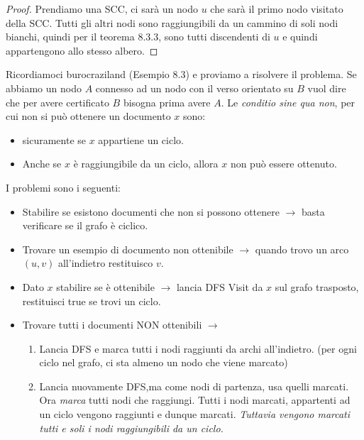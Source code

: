 \documentclass[a4paper]{article}
\begin{document}
\begin{proof}
  Prendiamo una SCC, ci sarà un nodo $u$ che sarà il primo nodo visitato della SCC.
  Tutti gli altri nodi sono raggiungibili da un cammino di soli nodi bianchi, quindi per il teorema 8.3.3, sono tutti
  discendenti di $u$ e quindi appartengono allo stesso albero.
\end{proof}
\noindent
Ricordiamoci burocraziland (Esempio 8.3) e proviamo a risolvere il problema.
Se abbiamo un nodo $A$ connesso ad un nodo con il verso orientato su $B$ vuol dire che per avere certificato $B$ bisogna
prima avere $A$. Le \textit{conditio sine qua non}, per cui non si può ottenere un documento $x$ sono:
\begin{itemize}
  \item sicuramente se $x$ appartiene un ciclo. 
\begin{figure}[H]
  \centering
\end{figure}
\item Anche se $x$ è raggiungibile da un ciclo, allora $x$ non può essere ottenuto.
\end{itemize}
I problemi sono i seguenti:
\begin{itemize}
  \item Stabilire se esistono documenti che non si possono ottenere $\rightarrow$ basta verificare se il grafo è ciclico.
  \item Trovare un esempio di documento non ottenibile $\rightarrow$ quando trovo un arco $(u,v)$ all'indietro restituisco $v$.
  \item Dato $x$ stabilire se è ottenibile $\rightarrow$ lancia DFS Visit da $x$ sul grafo trasposto, restituisci true se trovi un ciclo.
  \item Trovare tutti i documenti NON ottenibili $\rightarrow$ 
  \begin{enumerate}
    \item Lancia DFS e marca tutti i nodi raggiunti da archi all'indietro. (per ogni ciclo nel grafo, ci sta almeno un nodo che viene marcato)
    \item Lancia nuovamente DFS,ma come nodi di partenza, usa quelli marcati. Ora \textit{marca} tutti nodi che raggiungi. Tutti i nodi marcati,
    appartenti ad un ciclo vengono raggiunti e dunque marcati. \textit{Tuttavia vengono marcati tutti e soli i nodi raggiungibili da un ciclo.}
  \end{enumerate}
\end{itemize}
\end{document}
